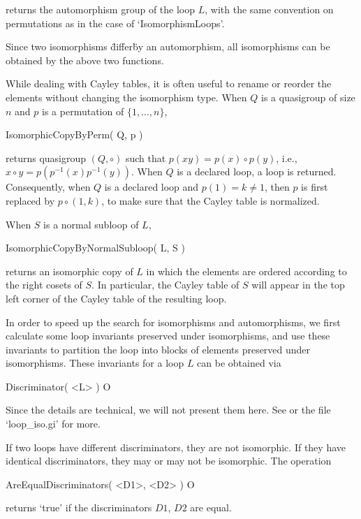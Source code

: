 returns the automorphism group of the loop $L$, with the same convention on
permutations as in the case of `IsomorphismLoops'.

Since two isomorphisms \"differ\" by an automorphism, all isomorphisms can be
obtained by the above two functions.

While dealing with Cayley tables, it is often useful to rename or reorder the
elements without changing the isomorphism type. When $Q$ is a quasigroup of
size $n$ and $p$ is a permutation of $\{1,\dots,n\}$,

\>IsomorphicCopyByPerm( Q, p )

returns quasigroup $(Q,\circ)$ such that $p(xy) = p(x)\circ p(y)$, i.e.,
$x\circ y = p( p^{-1}(x)p^{-1}(y))$. When $Q$ is a declared loop, a loop is
returned. Consequently, when $Q$ is a declared loop and $p(1) = k\ne 1$, then
$p$ is first replaced by $p\circ (1,k)$, to make sure that the Cayley table is
normalized.

When $S$ is a normal subloop of $L$,

\>IsomorphicCopyByNormalSubloop( L, S )

returns an isomorphic copy of $L$ in which the elements are ordered according
to the right cosets of $S$. In particular, the Cayley table of $S$ will appear
in the top left corner of the Cayley table of the resulting loop.


In order to speed up the search for isomorphisms and automorphisms, we first
calculate some loop invariants preserved under isomorphisms, and use these
invariants to partition the loop into blocks of elements preserved under
isomorphisms. These invariants for a loop $L$ can be obtained via

\>Discriminator( <L> ) O

Since the details are technical, we will not present them here. See \cite{Vo}
or the file `loop_iso.gi' for more.

If two loops have different discriminators, they are not isomorphic. If they
have identical discriminators, they may or may not be isomorphic. The operation

\>AreEqualDiscriminators( <D1>, <D2> ) O

returns `true' if the discriminators $D1$, $D2$ are equal.


